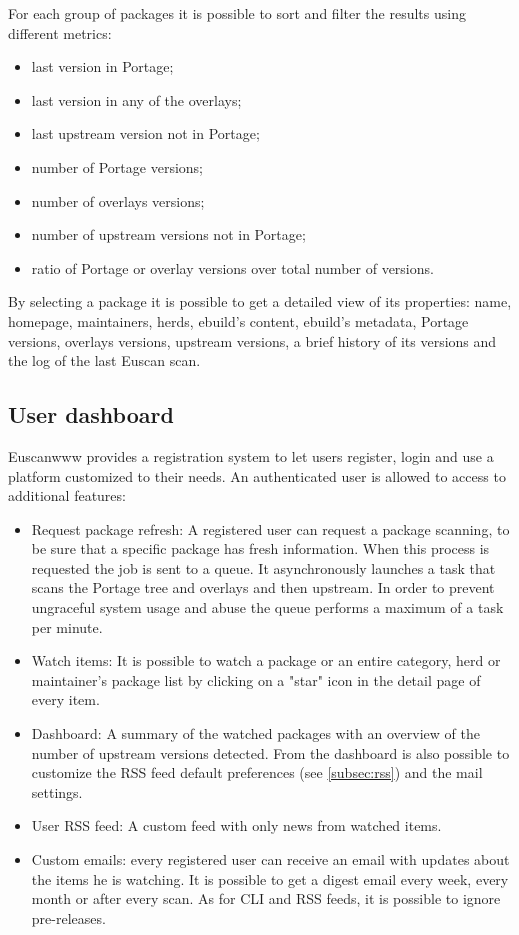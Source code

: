 For each group of packages it is possible to sort and filter the results using different metrics:

\begin{itemize}
\item last version in Portage;
\item last version in any of the overlays;
\item last upstream version not in Portage;
\item number of Portage versions;
\item number of overlays versions;
\item number of upstream versions not in Portage;
\item ratio of Portage or overlay versions over total number of versions.
\end{itemize}

By selecting a package it is possible to get a detailed view of its properties: name, homepage, maintainers, herds, ebuild's content, ebuild's metadata, Portage versions, overlays versions, upstream versions, a brief history of its versions and the log of the last Euscan scan.


\subsection{User dashboard}
Euscanwww provides a registration system to let users register, login and use a platform customized to their needs. An authenticated user is allowed to access to additional features:

\begin{itemize}
\item Request package refresh: A registered user can request a package scanning, to be sure that a specific package has fresh information. When this process is requested the job is sent to a queue. It asynchronously launches a task that scans the Portage tree and overlays and then upstream. In order to prevent ungraceful system usage and abuse the queue performs a maximum of a task per minute.

\item Watch items: It is possible to watch a package or an entire category, herd or maintainer's package list by clicking on a "star" icon in the detail page of every item.

\item Dashboard: A summary of the watched packages with an overview of the number of upstream versions detected. From the dashboard is also possible to customize the RSS feed default preferences (see \ref{subsec:rss}) and the mail settings.

\item User RSS feed: A custom feed with only news from watched items.

\item Custom emails: every registered user can receive an email with updates about the items he is watching. It is possible to get a digest email every week, every month or after every scan. As for CLI and RSS feeds, it is possible to ignore pre-releases.
\end{itemize}

